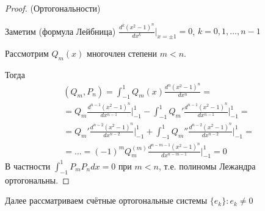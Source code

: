 \documentclass{article}
\theoremstyle{definition}
\numberwithin{theorem}{section}
\numberwithin{lemma}{section}
\numberwithin{definition}{section}
\numberwithin{corollary}{section}
\numberwithin{equation}{section}
\begin{document}
\begin{proof}
  (Ортогональности)

  Заметим (формула Лейбница) $\frac{d^{k}(x^{2}-1)^{n}}{dx^{k}} \big|_{x=\pm 1}=0 $,
  $k=0,1,\dots ,n-1$

  Рассмотрим $Q_m(x)$ многочлен степени $m<n$.

  Тогда
  \begin{gather*}
    (Q_m,P_n)=\int_{-1}^{1}Q_m(x)\frac{d^{n}(x^{2}-1)^{n}}{dx^{n}}= \\ 
    =Q_m \frac{d^{n-1}(x^{2}-1)^{n}}{dx^{n-1}}\big|_{-1}^{1}- \int_{-1}^{1}Q_m'\frac{d^{n-1}(x^{2}-1)^{n}}{dx^{n-1}}\big|_{-1}^{1} = \\ 
    = Q_m'\frac{d^{n-2}(x^{2}-1)^{n}}{dx^{n-2}}\big|_{-1}^{1} + \int_{-1}^{1}Q_m''\frac{d^{n-2}(x^{2}-1)^{n}}{dx^{n-2}}\big|_{-1}^{1} = \\ 
    = \dots = (-1)^{m}Q_m^{(m)}\frac{d^{n-m-1}(x^{2}-1)^{n}}{dx^{n-m-1}}\big|_{-1}^{1}=0
  \end{gather*}
  В частности $\int_{-1}^{1}P_mP_ndx=0$ при $m<n$, т.е. полиномы Лежандра ортогональны.
\end{proof}

Далее рассматриваем счётные ортогональные системы $\{e_k\}: e_k\neq0$
\end{document}
